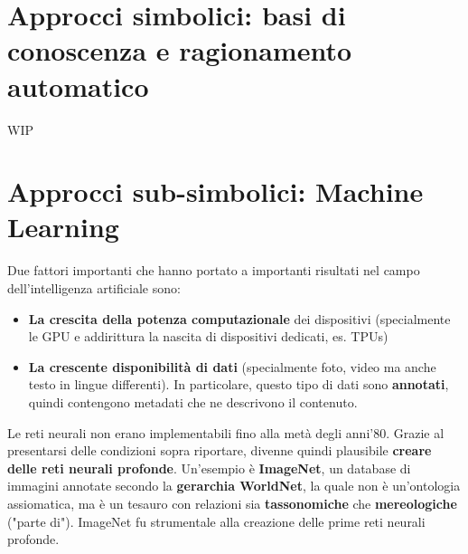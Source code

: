 \documentclass[12pt]{article}
\begin{document}
\section{Approcci simbolici: basi di conoscenza e ragionamento automatico}
WIP
\section{Approcci sub-simbolici: Machine Learning}
Due fattori importanti che hanno portato a importanti risultati nel campo dell'intelligenza artificiale sono:
\begin{itemize}
    \item \textbf{La crescita della potenza computazionale} dei dispositivi (specialmente le GPU e addirittura la nascita di dispositivi dedicati, es. TPUs)
    \item \textbf{La crescente disponibilità di dati} (specialmente foto, video ma anche testo in lingue differenti). In particolare, questo tipo di dati sono \textbf{annotati}, quindi contengono metadati che ne descrivono il contenuto.
\end{itemize} 
Le reti neurali non erano implementabili fino alla metà degli anni'80. Grazie al presentarsi delle condizioni sopra riportare, divenne quindi plausibile
\textbf{creare delle reti neurali profonde}. Un'esempio è \textbf{ImageNet}, un database di immagini annotate secondo la \textbf{gerarchia WorldNet}, la quale non è un'ontologia assiomatica, ma è un tesauro con relazioni sia \textbf{tassonomiche} che
\textbf{mereologiche} ("parte di"). ImageNet fu strumentale alla creazione delle prime reti neurali profonde.
\end{document}
